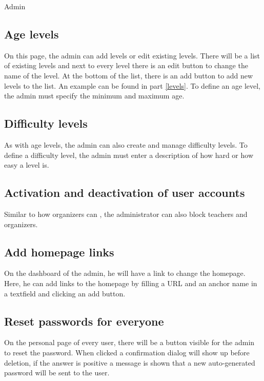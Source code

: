 \begin{section}{Admin}
\subsection{Age levels}
On this page, the admin can add levels or edit existing levels. There will be a list of existing levels and next to every level there is an edit button to change the name of the level. At the bottom of the list, there is an add button to add new levels to the list. An example can be found in part \ref{levels}. To define an age level, the admin must specify the minimum and maximum age. 

\subsection{Difficulty levels}
As with age levels, the admin can also create and manage difficulty levels. To define a difficulty level, the admin must enter a description of how hard or how easy a level is.

\subsection{Activation and deactivation of user accounts}
Similar to how organizers can , the administrator can also block teachers and organizers.

\subsection{Add homepage links}
On the dashboard of the admin, he will have a link to change the homepage. Here, he can add links to the homepage by filling a URL and an anchor name in a textfield and clicking an add button. 

\subsection{Reset passwords for everyone}
On the personal page of every user, there will be a button visible for the admin to reset the password. When clicked a confirmation dialog will show up before deletion, if the answer is positive a message is shown that a new auto-generated password will be sent to the user.

\end{section}

